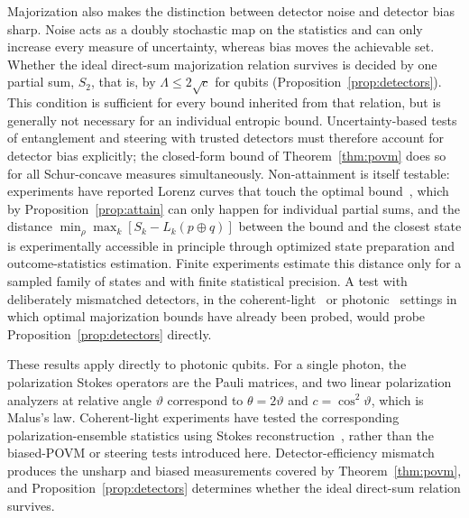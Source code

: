 \documentclass[aps,pra,twocolumn,superscriptaddress,nofootinbib,floatfix]{revtex4-2}
\theoremstyle{definition}
\newcommand{\sqc}{\sqrt{c}}
\begin{document}
Majorization also makes the distinction between detector noise and detector
bias sharp. Noise acts as a doubly stochastic map on the statistics and can
only increase every measure of uncertainty, whereas bias moves the achievable
set. Whether the ideal direct-sum majorization relation survives is decided by
one partial sum, $S_2$, that is, by $\Lambda\le2\sqc$ for qubits
(Proposition~\ref{prop:detectors}). This condition is sufficient for every bound
inherited from that relation, but is generally not necessary for an individual
entropic bound. Uncertainty-based tests of entanglement and
steering with trusted detectors must therefore account for detector bias
explicitly; the closed-form bound of Theorem~\ref{thm:povm} does so for all
Schur-concave measures simultaneously. Non-attainment is itself testable:
experiments have reported Lorenz curves that touch the optimal
bound~\cite{Wang2020}, which by Proposition~\ref{prop:attain} can only happen
for individual partial sums, and the distance
$\min_\rho\max_k[S_k-L_k(p\oplus q)]$ between the bound and the closest state is
experimentally accessible in principle through optimized state preparation and
outcome-statistics estimation. Finite experiments estimate this distance only for
a sampled family of states and with finite statistical precision. A test with
deliberately mismatched detectors,
in the coherent-light~\cite{Wang2020} or photonic~\cite{Yuan2023} settings in
which optimal majorization bounds have already been probed, would probe
Proposition~\ref{prop:detectors} directly.

These results apply directly to photonic qubits. For a single photon, the
polarization Stokes operators are the Pauli matrices, and two linear polarization
analyzers at relative angle $\vartheta$ correspond to $\theta=2\vartheta$ and
$c=\cos^2\vartheta$, which is Malus's law. Coherent-light experiments have tested
the corresponding polarization-ensemble statistics using Stokes
reconstruction~\cite{Wang2020}, rather than the biased-POVM or steering tests
introduced here. Detector-efficiency mismatch produces the unsharp and biased
measurements covered by Theorem~\ref{thm:povm}, and
Proposition~\ref{prop:detectors} determines whether the ideal direct-sum relation
survives.
\end{document}
